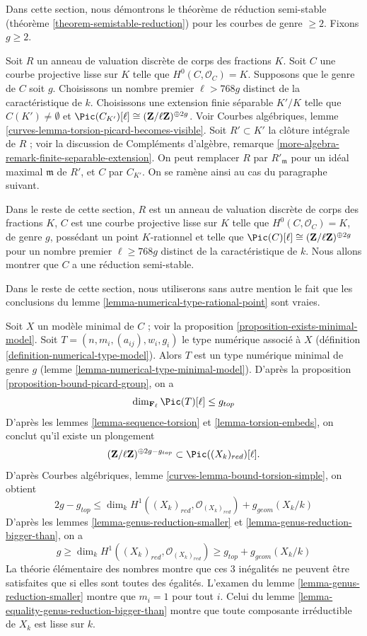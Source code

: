 \noindent
Dans cette section, nous démontrons le théorème de réduction semi-stable
(théorème \ref{theorem-semistable-reduction}) pour les courbes de genre
$\geq2$. Fixons $g\geq2$.

\medskip\noindent
Soit $R$ un anneau de valuation discrète de corps des fractions $K$.
Soit $C$ une courbe projective lisse sur $K$ telle que
$H^0(C,\mathcal{O}_C)=K$. Supposons que le genre de $C$ soit $g$.
Choisissons un nombre premier $\ell>768g$ distinct de la caractéristique de
$k$. Choisissons une extension finie séparable $K'/K$ telle que
$C(K') \not = \emptyset$ et
$\Pic(C_{K'})[\ell]\cong(\mathbf{Z}/\ell\mathbf{Z})^{\oplus2g}$.
Voir Courbes algébriques, lemme
\ref{curves-lemma-torsion-picard-becomes-visible}. Soit $R'\subset K'$ la
clôture intégrale de $R$ ; voir la discussion de Compléments d'algèbre,
remarque \ref{more-algebra-remark-finite-separable-extension}. On peut
remplacer $R$ par $R'_{\mathfrak m}$ pour un idéal maximal $\mathfrak m$
de $R'$, et $C$ par $C_{K'}$. On se ramène ainsi au cas du paragraphe
suivant.

\medskip\noindent
Dans le reste de cette section, $R$ est un anneau de valuation discrète de
corps des fractions $K$, $C$ est une courbe projective lisse sur $K$ telle
que $H^0(C,\mathcal{O}_C)=K$, de genre $g$, possédant un point
$K$-rationnel et telle que
$\Pic(C)[\ell]\cong(\mathbf{Z}/\ell\mathbf{Z})^{\oplus2g}$ pour un nombre
premier $\ell\geq768g$ distinct de la caractéristique de $k$. Nous allons
montrer que $C$ a une réduction semi-stable.

\medskip\noindent
Dans le reste de cette section, nous utiliserons sans autre mention le fait
que les conclusions du lemme \ref{lemma-numerical-type-rational-point}
sont vraies.

\medskip\noindent
Soit $X$ un modèle minimal de $C$ ; voir la proposition
\ref{proposition-exists-minimal-model}. Soit
$T=(n, m_i, (a_{ij}), w_i, g_i)$ le type numérique associé à $X$
(définition \ref{definition-numerical-type-model}). Alors $T$ est un type
numérique minimal de genre $g$ (lemme
\ref{lemma-numerical-type-minimal-model}). D'après la proposition
\ref{proposition-bound-picard-group}, on a
$$
\dim_{\mathbf{F}_\ell} \Pic(T)[\ell] \leq g_{top}
$$
D'après les lemmes \ref{lemma-sequence-torsion} et
\ref{lemma-torsion-embeds}, on conclut qu'il existe un plongement
$$
(\mathbf{Z}/\ell \mathbf{Z})^{\oplus 2g - g_{top}}
\subset \Pic((X_k)_{red})[\ell].
$$
D'après Courbes algébriques, lemme
\ref{curves-lemma-bound-torsion-simple}, on obtient
$$
2g - g_{top} \leq
\dim_k H^1((X_k)_{red}, \mathcal{O}_{(X_k)_{red}}) + g_{geom}(X_k/k)
$$
D'après les lemmes \ref{lemma-genus-reduction-smaller} et
\ref{lemma-genus-reduction-bigger-than}, on a
$$
g \geq \dim_k H^1((X_k)_{red}, \mathcal{O}_{(X_k)_{red}}) \geq
g_{top} + g_{geom}(X_k/k)
$$
La théorie élémentaire des nombres montre que ces $3$ inégalités ne
peuvent être satisfaites que si elles sont toutes des égalités.
L'examen du lemme \ref{lemma-genus-reduction-smaller} montre que
$m_i=1$ pour tout $i$. Celui du lemme
\ref{lemma-equality-genus-reduction-bigger-than} montre que toute composante
irréductible de $X_k$ est lisse sur $k$.

